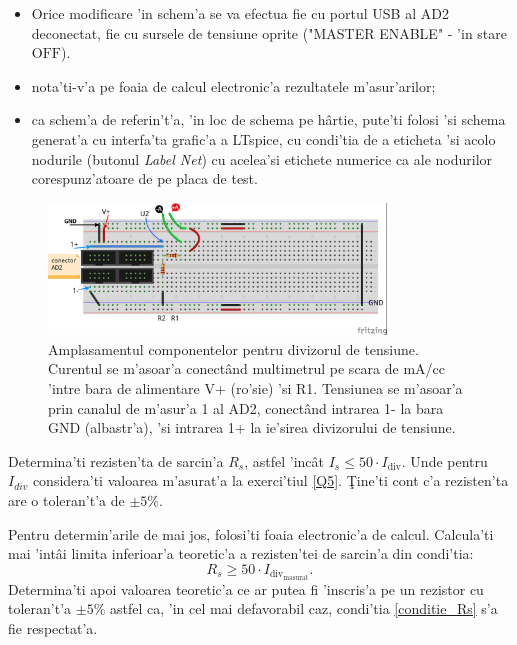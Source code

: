 \begin{observ}
		\begin{itemize}
			\item 	{\color{blue}
				Orice modificare 'in schem'a se va efectua fie cu portul USB al AD2 deconectat, fie cu sursele de tensiune oprite 
				("MASTER ENABLE" - 'in stare $\mathrm{OFF}$).}
\item nota'ti-v'a pe foaia de calcul electronic'a rezultatele m'asur'arilor;
\item ca schem'a de referin't'a, 'in loc de schema pe h\^artie, pute'ti folosi 'si schema generat'a cu interfa'ta grafic'a a LTspice, cu condi'tia de a eticheta 'si acolo nodurile (butonul \textit{Label Net}) cu acelea'si etichete numerice ca ale nodurilor corespunz'atoare de pe placa de test.
\end{itemize} 
\end{observ}
%
\begin{figure}
	\centering
		\includegraphics[width=0.8\textwidth]{laborator_01/figuri/4_divizor_1_bb}
	\caption{Amplasamentul componentelor pentru divizorul de tensiune. Curentul se m'asoar'a conect\^and multimetrul pe scara de mA/cc 'intre bara de alimentare V+ (ro'sie) 'si R1. Tensiunea se m'asoar'a prin canalul de m'asur'a 1 al AD2, conect\^and intrarea 1- la bara GND (albastr'a), 'si intrarea 1+ la ie'sirea divizorului de tensiune.}
	\label{fig:4_divizor1_bb}
\end{figure}
%
%
\begin{exercise} \label{Q6}
	Determina'ti rezisten'ta de sarcin'a $R_s$, astfel 'inc\^at $I_s \leq 50 \cdot I_{\mathrm{div}}$. Unde pentru $I_{div}$ considera'ti valoarea m'asurat'a la exerci'tiul \eqref{Q5}. \c{T}ine'ti cont c'a rezisten'ta are o toleran't'a de $\pm 5\%$.	
\end{exercise}
%
\begin{indicatie}
	Pentru determin'arile de mai jos, folosi'ti foaia electronic'a de calcul.
	Calcula'ti mai 'int\^ai limita inferioar'a teoretic'a a rezisten'tei de sarcin'a din condi'tia:
\begin{equation} \label{conditie_Rs}
	 R_s \geq 50 \cdot I_{\mathrm{div}_{\mathrm{masurat}}}.
\end{equation}
Determina'ti apoi valoarea teoretic'a ce ar putea fi 'inscris'a pe un rezistor cu toleran't'a $\pm 5\%$ astfel ca, 'in cel mai defavorabil caz, condi'tia \eqref{conditie_Rs} s'a fie respectat'a.
\end{indicatie}
